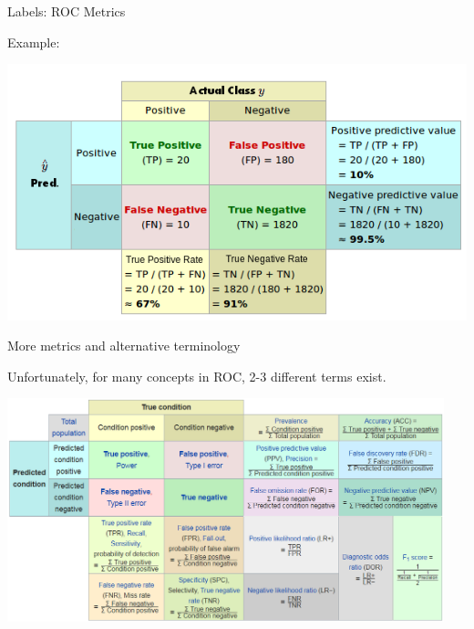 \documentclass[11pt,compress,t,notes=noshow, xcolor=table]{beamer}
\begin{document}

\begin{vbframe}{Labels: ROC Metrics}

Example:

\begin{center}
  \includegraphics[width=\textwidth]{figure_man/roc-confmatrix-example.png}
\end{center}

\end{vbframe}


\begin{vbframe}{More metrics and alternative terminology}

Unfortunately, for many concepts in ROC, 2-3 different terms exist.

\begin{center}
\includegraphics[width=0.95\textwidth]{figure_man/roc-confmatrix-allterms.png}
\end{center}
\href{https://en.wikipedia.org/wiki/F1_score#Diagnostic_testing}{} $\phantom{blablabla}$
\href{https://upload.wikimedia.org/wikipedia/commons/0/0e/DiagnosticTesting_Diagram.svg}{}
\end{vbframe}
\end{document}
